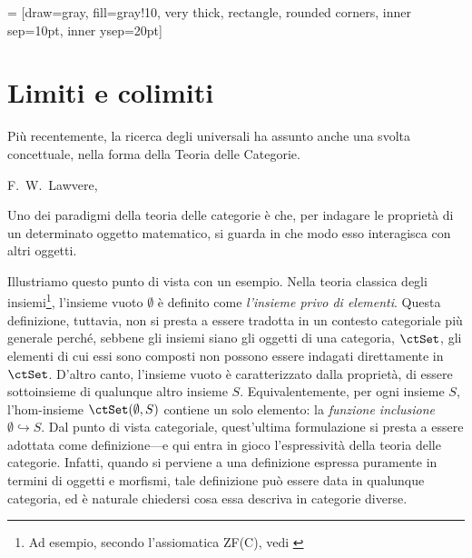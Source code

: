  = [draw=gray, fill=gray!10, very thick,
    rectangle, rounded corners, inner sep=10pt, inner ysep=20pt]
\chapter{Limiti e colimiti}\label{chap_limiti_colimiti}
\epigraph{Più recentemente, la ricerca degli universali ha assunto anche una svolta concettuale, nella forma della Teoria delle Categorie.}{F.\ W.\ Lawvere, \cite{lawvere1969adjointness}}
	




Uno dei paradigmi della teoria delle categorie è che, per indagare le proprietà di un determinato oggetto matematico, si guarda in che modo esso interagisca con  altri oggetti.

Illustriamo questo punto di vista con un esempio. Nella teoria classica degli insiemi\footnote{Ad esempio, secondo l'assiomatica ZF(C), vedi \cite{ZFC}}, l'insieme vuoto \(\emptyset\) è definito come \emph{l'insieme privo di elementi}. Questa definizione, tuttavia, non si presta a essere tradotta in un contesto categoriale più generale perché, sebbene gli insiemi siano gli oggetti di una categoria, \(\ctSet\), gli elementi di cui essi sono composti non possono essere indagati direttamente in \(\ctSet\). D'altro canto, l'insieme vuoto è caratterizzato dalla  proprietà, di essere sottoinsieme di qualunque altro insieme \(S\). Equivalentemente, per ogni insieme \(S\), l'hom-insieme \(\Hom\ctSet(\emptyset,S)\) contiene un solo elemento: la  \emph{funzione inclusione}  \(\emptyset \hookrightarrow S\). Dal punto di vista categoriale, quest'ultima formulazione si presta a essere adottata come definizione---e qui entra in gioco l'espressività della teoria delle categorie. Infatti, quando si perviene a una definizione espressa puramente in termini di oggetti e morfismi,  tale definizione può essere data in qualunque categoria, ed è naturale chiedersi cosa essa descriva in categorie diverse. 

